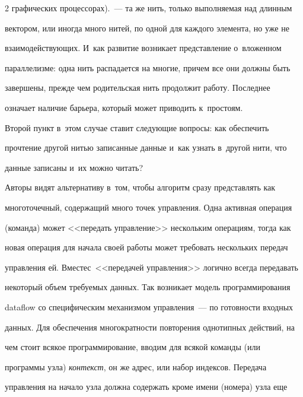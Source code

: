 \begin{multicols}{2}
{графических процессорах).}~--- та же нить, только выполняемая над длинным 

вектором, или иногда много нитей, по одной для каждого элемента, но уже не 

взаимодействующих. И~как развитие возникает представление о~вложенном 

параллелизме: одна нить распадается на многие, причем все они должны быть 

завершены, прежде чем родительская нить продолжит работу. Последнее 

означает наличие барьера, который может приводить к~простоям.

{ 



}





  

  Второй пункт в~этом случае ставит следующие вопросы: как обеспечить 

прочтение другой нитью записанные данные и~как узнать в~другой нити, что 

данные записаны и~их можно читать?

  

  Авторы видят альтернативу в~том, чтобы алгоритм сразу представлять как 

многоточечный, содержа\-щий много точек управ\-ле\-ния. Одна активная операция 

(команда) может <<передать управ\-ле\-ние>> нескольким операциям, тогда как 

новая операция для начала своей работы может требовать нескольких передач 

управления ей. Вместе\linebreak с~<<передачей управления>> логично всегда передавать 

некоторый объем требуемых данных. Так возникает модель программирования 

dataflow со специфическим механизмом управления~--- по готовности входных 

данных. Для обеспечения многократности повторения однотипных действий, на 

чем стоит всякое программирование, вводим для всякой команды (или 

программы узла) \textit{контекст}, он же адрес, или набор индексов. Передача 

управления на начало узла должна содержать кроме имени (номера) узла еще 


\end{multicols}
